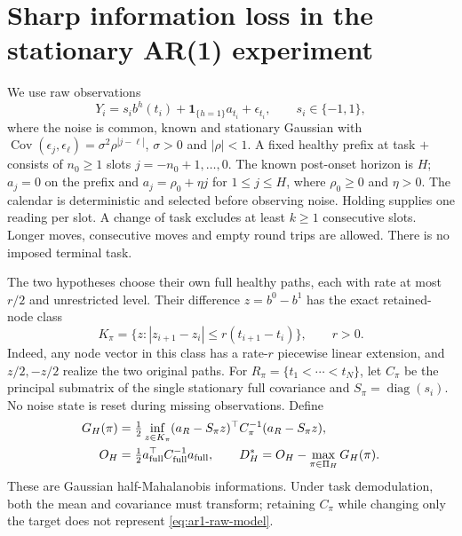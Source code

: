 
\section{Sharp information loss in the stationary AR(1) experiment}
\label{sec:ar1-sharp}

We use raw observations
\begin{equation}\label{eq:ar1-raw-model}
 Y_i=s_i b^h(t_i)+\mathbf1_{\{h=1\}}a_{t_i}+\epsilon_{t_i},
 \qquad s_i\in\{-1,1\},
\end{equation}
where the noise is common, known and stationary Gaussian with
$\operatorname{Cov}(\epsilon_j,\epsilon_\ell)=\sigma^2\rho^{|j-\ell|}$,
$\sigma>0$ and $|\rho|<1$. A fixed healthy prefix at task $+$ consists of
$n_0\ge1$ slots $j=-n_0+1,\ldots,0$. The known post-onset horizon is $H$;
$a_j=0$ on the prefix and $a_j=\rho_0+\eta j$ for $1\le j\le H$,
where $\rho_0\ge0$ and $\eta>0$. The calendar is deterministic and selected
before observing noise. Holding supplies one reading per slot. A change of
task excludes at least $k\ge1$ consecutive slots. Longer moves, consecutive
moves and empty round trips are allowed. There is no imposed terminal task.

The two hypotheses choose their own full healthy paths, each with rate at
most $r/2$ and unrestricted level. Their difference $z=b^0-b^1$ has the exact
retained-node class
\begin{equation}\label{eq:ar1-trace}
 K_\pi=\{z:|z_{i+1}-z_i|\le r(t_{i+1}-t_i)\},\qquad r>0.
\end{equation}
Indeed, any node vector in this class has a rate-$r$ piecewise linear
extension, and $z/2,-z/2$ realize the two original paths.
For $R_\pi=\{t_1<\cdots<t_N\}$, let $C_\pi$ be the principal submatrix of the
single stationary full covariance and $S_\pi=\operatorname{diag}(s_i)$.
No noise state is reset during missing observations. Define
\begin{align}\label{eq:ar1-information}
 G_H(\pi)&=\tfrac12\inf_{z\in K_\pi}
 (a_R-S_\pi z)^\top C_\pi^{-1}(a_R-S_\pi z),\nonumber\\
 O_H&=\tfrac12a_{\rm full}^\top C_{\rm full}^{-1}a_{\rm full},\qquad
 D_H^*=O_H-\max_{\pi\in\Pi_H}G_H(\pi).
\end{align}
These are Gaussian half-Mahalanobis informations. Under task demodulation,
both the mean and covariance must transform; retaining $C_\pi$ while changing
only the target does not represent \eqref{eq:ar1-raw-model}.

